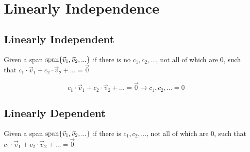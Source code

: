 \section{Linearly Independence}

\subsection{Linearly Independent}

  \begin{definition}
    Given a span $ \operatorname{span} \{ \vec{v}_{1}, \vec{v}_{2}, ... \} $
    if there is no $ c_{1}, c_{2}, ... $, not all of which are $ 0 $,
    such that $ c_{1} \cdot \vec{v}_{1} + c_{2} \cdot \vec{v}_{2} + ... = \vec{0} $
  \end{definition}
  \begin{equation}
    c_{1} \cdot \vec{v}_{1} + c_{2} \cdot \vec{v}_{2} + ... = \vec{0} 
    \rightarrow
    c_{1}, c_{2}, ... = 0
  \end{equation}

\subsection{Linearly Dependent}

  \begin{definition}
    Given a span $ \operatorname{span} \{ \vec{v}_{1}, \vec{v}_{2}, ... \} $
    if there is $ c_{1}, c_{2}, ... $, not all of which are $ 0 $,
    such that $ c_{1} \cdot \vec{v}_{1} + c_{2} \cdot \vec{v}_{2} + ... = \vec{0} $
  \end{definition}